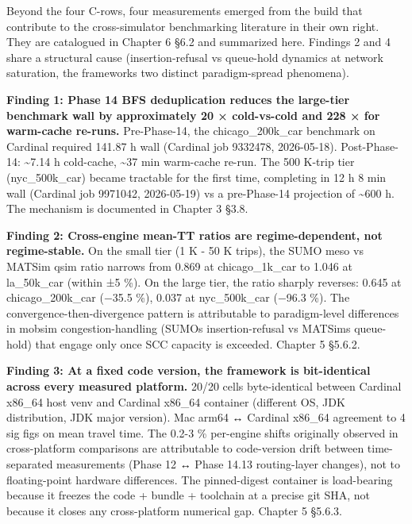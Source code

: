 Beyond the four C-rows, four measurements emerged from the build that
contribute to the cross-simulator benchmarking literature in their own
right. They are catalogued in Chapter 6 §6.2 and summarized here.
Findings 2 and 4 share a structural cause (insertion-refusal vs
queue-hold dynamics at network saturation, the
framework\textquotesingle s two distinct paradigm-spread phenomena).

\textbf{Finding 1: Phase 14 BFS deduplication reduces the large-tier
benchmark wall by approximately 20 × cold-vs-cold and 228 × for
warm-cache re-runs.} Pre-Phase-14, the chicago\_200k\_car benchmark on
Cardinal required 141.87 h wall (Cardinal job 9332478, 2026-05-18).
Post-Phase-14: \textasciitilde7.14 h cold-cache, \textasciitilde37 min
warm-cache re-run. The 500 K-trip tier (nyc\_500k\_car) became tractable
for the first time, completing in 12 h 8 min wall (Cardinal job 9971042,
2026-05-19) vs a pre-Phase-14 projection of \textasciitilde600 h. The
mechanism is documented in Chapter 3 §3.8.

\textbf{Finding 2: Cross-engine mean-TT ratios are regime-dependent, not
regime-stable.} On the small tier (1 K - 50 K trips), the SUMO meso vs
MATSim qsim ratio narrows from 0.869 at chicago\_1k\_car to 1.046 at
la\_50k\_car (within ±5 \%). On the large tier, the ratio sharply
reverses: 0.645 at chicago\_200k\_car (−35.5 \%), 0.037 at
nyc\_500k\_car (−96.3 \%). The convergence-then-divergence pattern is
attributable to paradigm-level differences in mobsim congestion-handling
(SUMO\textquotesingle s insertion-refusal vs MATSim\textquotesingle s
queue-hold) that engage only once SCC capacity is exceeded. Chapter 5
§5.6.2.

\textbf{Finding 3: At a fixed code version, the framework is
bit-identical across every measured platform.} 20/20 cells
byte-identical between Cardinal x86\_64 host venv and Cardinal x86\_64
container (different OS, JDK distribution, JDK major version). Mac arm64
↔ Cardinal x86\_64 agreement to 4 sig figs on mean travel time. The
0.2-3 \% per-engine shifts originally observed in cross-platform
comparisons are attributable to code-version drift between
time-separated measurements (Phase 12 ↔ Phase 14.13 routing-layer
changes), not to floating-point hardware differences. The pinned-digest
container is load-bearing because it freezes the code + bundle +
toolchain at a precise git SHA, not because it closes any cross-platform
numerical gap. Chapter 5 §5.6.3.

